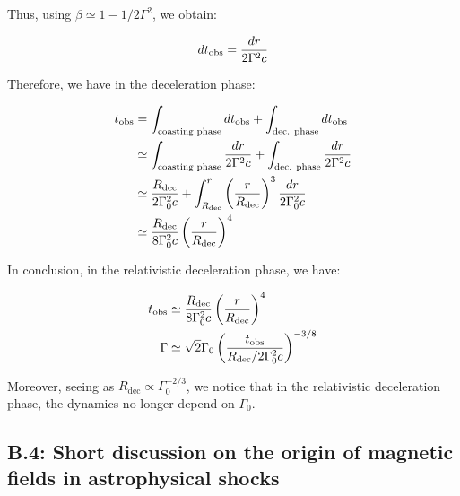 Thus, using $\beta \simeq 1 - 1/2\Gamma^2$, we obtain:

$$d{t_{\mathrm{obs}}} = \frac{dr}{2\Gamma^2 c} $$

Therefore, we have in the deceleration phase:

\begin{align}
    {t_{\mathrm{obs}}} &= \int_{\text{coasting phase}} d{t_{\mathrm{obs}}} + \int_{\text{dec. phase}} d{t_{\mathrm{obs}}} \\
          &\simeq \int_{\text{coasting phase}} \frac{dr}{2\Gamma^2 c} + \int_{\text{dec. phase}} \frac{dr}{2\Gamma^2 c} \\
          &\simeq \frac{R_\text{dec}}{2\Gamma_0^2 c} + \int_{R_{\text{dec}}}^{r} \left( \frac{r}{R_{\text{dec}}} \right)^3 \frac{dr}{2\Gamma_0^2 c} \\
          &\simeq \frac{R_{\text{dec}}}{8\Gamma_0^2 c}\left( \frac{r}{R_{\text{dec}}} \right)^4
\end{align}

In conclusion, in the relativistic deceleration phase, we have:

\begin{align}
    {t_{\mathrm{obs}}} &\simeq \frac{R_{\text{dec}}}{8\Gamma_0^2 c}\left( \frac{r}{R_{\text{dec}}} \right)^4 \\
    \Gamma &\simeq \sqrt{2} \Gamma_0 \left( \frac{{t_{\mathrm{obs}}}}{R_{\text{dec}}/2\Gamma_0^2c} \right)^{-3/8}
\end{align}

Moreover, seeing as $R_{\text{dec}} \propto \Gamma_0^{-2/3}$, we notice that in the relativistic deceleration phase, the dynamics no longer depend on $\Gamma_0$.
\subsection*{B.4: Short discussion on the origin of magnetic fields in astrophysical shocks}
